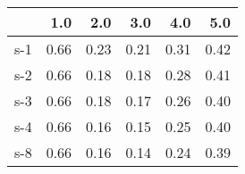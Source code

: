 \begin{tabular}{lrrrrr}
\toprule
{} &  1.0 &  2.0 &  3.0 &  4.0 &  5.0 \\
\midrule
s-1 & 0.66 & 0.23 & 0.21 & 0.31 & 0.42 \\
s-2 & 0.66 & 0.18 & 0.18 & 0.28 & 0.41 \\
s-3 & 0.66 & 0.18 & 0.17 & 0.26 & 0.40 \\
s-4 & 0.66 & 0.16 & 0.15 & 0.25 & 0.40 \\
s-8 & 0.66 & 0.16 & 0.14 & 0.24 & 0.39 \\
\bottomrule
\end{tabular}
